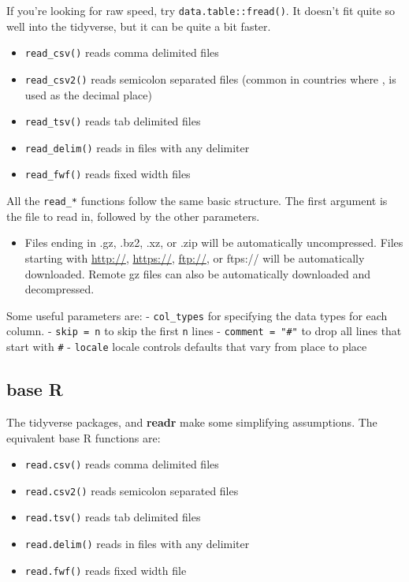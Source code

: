\documentclass[]{book}
\providecommand{\tightlist}{%
  \setlength{\itemsep}{0pt}\setlength{\parskip}{0pt}}
\newenvironment{rmdblock}[1]
  {\begin{shaded*}
  \begin{itemize}
  \renewcommand{\labelitemi}{
    \raisebox{-.7\height}[0pt][0pt]{
      {\setkeys{Gin}{width=3em,keepaspectratio}\texttt{[image: images/\#1]}}
    }
  }
  \item
  }
  {
  \end{itemize}
  \end{shaded*}
  }
\newenvironment{rmdnote}
  {\begin{rmdblock}{note}}
  {\end{rmdblock}}
\let\BeginKnitrBlock\begin \let\EndKnitrBlock\end
\begin{document}
\BeginKnitrBlock{rmdtip}
If you're looking for raw speed, try \texttt{data.table::fread()}. It
doesn't fit quite so well into the tidyverse, but it can be quite a bit
faster.
\EndKnitrBlock{rmdtip}

\begin{itemize}
\tightlist
\item
  \texttt{read\_csv()} reads comma delimited files
\item
  \texttt{read\_csv2()} reads semicolon separated files (common in
  countries where , is used as the decimal place)
\item
  \texttt{read\_tsv()} reads tab delimited files
\item
  \texttt{read\_delim()} reads in files with any delimiter
\item
  \texttt{read\_fwf()} reads fixed width files
\end{itemize}

All the \texttt{read\_*} functions follow the same basic structure. The
first argument is the file to read in, followed by the other parameters.

\begin{rmdnote}
Files ending in .gz, .bz2, .xz, or .zip will be automatically
uncompressed. Files starting with \url{http://}, \url{https://},
\url{ftp://}, or ftps:// will be automatically downloaded. Remote gz
files can also be automatically downloaded and decompressed.
\end{rmdnote}

Some useful parameters are: - \texttt{col\_types} for specifying the
data types for each column. - \texttt{skip\ =\ n} to skip the first
\texttt{n} lines - \texttt{comment\ =\ "\#"} to drop all lines that
start with \texttt{\#} - \texttt{locale} locale controls defaults that
vary from place to place

\subsection{base R}\label{base-r}

The tidyverse packages, and \textbf{readr} make some simplifying
assumptions. The equivalent base R functions are:

\begin{itemize}
\tightlist
\item
  \texttt{read.csv()} reads comma delimited files
\item
  \texttt{read.csv2()} reads semicolon separated files
\item
  \texttt{read.tsv()} reads tab delimited files
\item
  \texttt{read.delim()} reads in files with any delimiter
\item
  \texttt{read.fwf()} reads fixed width file
\end{itemize}
\end{document}

